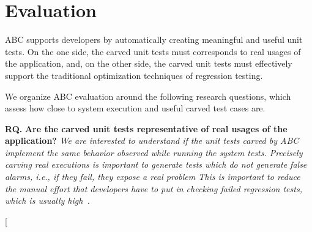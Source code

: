 \documentclass[10pt,conference]{IEEEtran}
\makeatletter
\gdef\xxx{\@ifnextchar[\xxx@lab\xxx@nolab}
\newcommand{\abc}{\textsf{ABC}\xspace}
\makeatother
\begin{document}




\section{Evaluation}
\abc supports developers by automatically creating meaningful and useful unit tests.
On the one side, the carved unit tests must corresponds to real usages of the application, and,
on the other side, the carved unit tests must effectively support the traditional
optimization techniques of regression testing.

We organize \abc evaluation around the following research questions, which assess how close
to system execution and useful carved test cases are.

\newenvironment{RQ}[1][]{\par\noindent
   \textbf{RQ\theRQ. #1} \rmfamily}{}

\begin{RQ}
\textbf{Are the carved unit tests representative of real usages of the application?}
\emph{We are interested to understand if the unit tests carved by \abc
implement the same behavior observed while running the system tests.
Precisely carving real executions is important to generate tests which 
do not generate false alarms, i.e., if they fail, they expose a real problem
This is important to reduce the manual effort that developers have to put in checking
failed regression tests, which is usually high~\cite{arcuri-icst-2017?}.}
\end{RQ}

\xxx{Alessio HERE}
\end{document}
